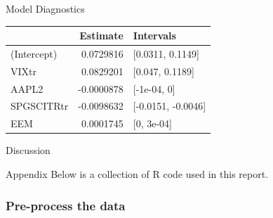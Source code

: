 \documentclass[]{article}
\begin{document}
\begin{section}{Model Diagnostics}
\begin{table}[H]
\centering
\begin{tabular}{l|r|l}
\hline
  & Estimate & Intervals\\
\hline
(Intercept) & 0.0729816 & [0.0311, 0.1149]\\
\hline
VIXtr & 0.0829201 & [0.047, 0.1189]\\
\hline
AAPL2 & -0.0000878 & [-1e-04, 0]\\
\hline
SPGSCITRtr & -0.0098632 & [-0.0151, -0.0046]\\
\hline
EEM & 0.0001745 & [0, 3e-04]\\
\hline
\end{tabular}
\end{table}

\end{section}

\begin{section}{Discussion}
\end{section}

\newpage

\begin{section}{Appendix}
Below is a collection of R code used in this report.
\end{section}

\subsubsection{Pre-process the data}\label{pre-process-the-data}
\end{document}

